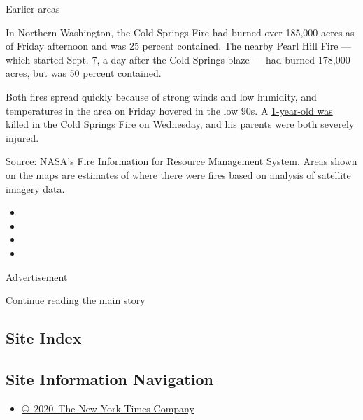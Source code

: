 Earlier areas

In Northern Washington, the Cold Springs Fire had burned over 185,000
acres as of Friday afternoon and was 25 percent contained. The nearby
Pearl Hill Fire --- which started Sept. 7, a day after the Cold Springs
blaze --- had burned 178,000 acres, but was 50 percent contained.

Both fires spread quickly because of strong winds and low humidity, and
temperatures in the area on Friday hovered in the low 90s. A
\href{https://www.nytimes3xbfgragh.onion/2020/09/09/us/fires-oregon-california-live-updates.html\#link-1a2d0777}{1-year-old
was killed} in the Cold Springs Fire on Wednesday, and his parents were
both severely injured.

Source: NASA's Fire Information for Resource Management System. Areas
shown on the maps are estimates of where there were fires based on
analysis of satellite imagery data.

\begin{itemize}
\item
\item
\item
\item
\end{itemize}

Advertisement

\protect\hyperlink{after-bottom}{Continue reading the main story}

\hypertarget{site-index}{%
\subsection{Site Index}\label{site-index}}

\hypertarget{site-information-navigation}{%
\subsection{Site Information
Navigation}\label{site-information-navigation}}

\begin{itemize}
\tightlist
\item
  \href{https://help.nytimes3xbfgragh.onion/hc/en-us/articles/115014792127-Copyright-notice}{©~2020~The
  New York Times Company}
\end{itemize}

